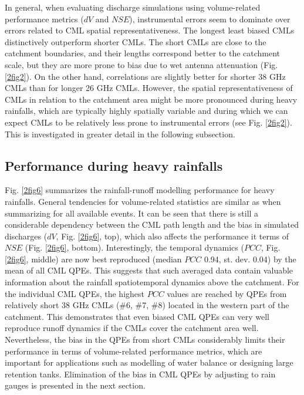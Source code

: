 \documentclass{ctuthesis}\usepackage[]{graphicx}\usepackage[]{color}
\begin{document}
In general, when evaluating discharge simulations using volume-related performance metrics ($dV$ and $NSE$), instrumental errors seem to dominate over errors related to CML spatial representativeness. The longest least biased CMLs distinctively outperform shorter CMLs. The short CMLs are close to the catchment boundaries, and their lengths correspond better to the catchment scale, but they are more prone to bias due to wet antenna attenuation (Fig. \ref{2fig2}). On the other hand, correlations are slightly better for shorter 38 GHz CMLs than for longer 26 GHz CMLs. However, the spatial representativeness of CMLs in relation to the catchment area might be more pronounced during heavy rainfalls, which are typically highly spatially variable and during which we can expect CMLs to be relatively less prone to instrumental errors (see Fig. \ref{2fig2}). This is investigated in greater detail in the following subsection.

\subsection{Performance during heavy rainfalls}

Fig. \ref{2fig6} summarizes the rainfall-runoff modelling performance for heavy rainfalls. General tendencies for volume-related statistics are similar as when summarizing for all available events. It can be seen that there is still a considerable dependency between the CML path length and the bias in simulated discharges ($dV$, Fig. \ref{2fig6}, top), which also affects the performance it terms of $NSE$ (Fig. \ref{2fig6}, bottom). Interestingly, the temporal dynamics ($PCC$, Fig. \ref{2fig6}, middle) are now best reproduced (median $PCC$ 0.94, st. dev. 0.04) by the mean of all CML QPEs. This suggests that such averaged data contain valuable information about the rainfall spatiotemporal dynamics above the catchment. For the individual CML QPEs, the highest $PCC$ values are reached by QPEs from relatively short 38 GHz CMLs (\#6, \#7, \#8) located in the western part of the catchment. This demonstrates that even biased CML QPEs can very well reproduce runoff dynamics if the CMLs cover the catchment area well. Nevertheless, the bias in the QPEs from short CMLs considerably limits their performance in terms of volume-related performance metrics, which are important for applications such as modelling of water balance or designing large retention tanks. Elimination of the bias in CML QPEs by adjusting to rain gauges is presented in the next section.
\end{document}
